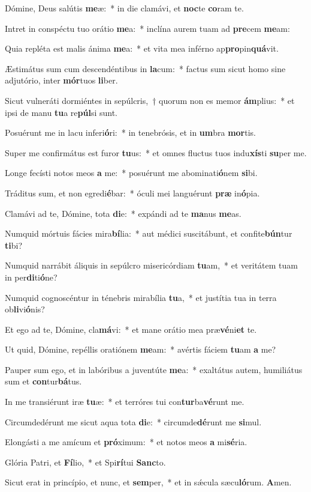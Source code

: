 \item Dómine, Deus salútis \textbf{me}æ:~* in die clamávi, et \textbf{noc}te \textbf{co}ram te.
\item Intret in conspéctu tuo orátio \textbf{me}a:~* inclína aurem tuam ad \textbf{pre}cem \textbf{me}am:
\item Quia repléta est malis ánima \textbf{me}a:~* et vita mea inférno ap\textbf{pro}pin\textbf{quá}vit.
\item Æstimátus sum cum descendéntibus in \textbf{la}cum:~* factus sum sicut homo sine adjutório, inter \textbf{mór}tuos \textbf{li}ber.
\item Sicut vulneráti dormiéntes in sepúlcris,~† quorum non es memor \textbf{ám}plius:~* et ipsi de manu \textbf{tu}a re\textbf{púl}si sunt.
\item Posuérunt me in lacu inferi\textbf{ó}ri:~* in tenebrósis, et in \textbf{um}bra \textbf{mor}tis.
\item Super me confirmátus est furor \textbf{tu}us:~* et omnes fluctus tuos indu\textbf{xís}ti \textbf{su}per me.
\item Longe fecísti notos meos \textbf{a} me:~* posuérunt me abominati\textbf{ó}nem \textbf{si}bi.
\item Tráditus sum, et non egredi\textbf{é}bar:~* óculi mei languérunt \textbf{præ} in\textbf{ó}pia.
\item Clamávi ad te, Dómine, tota \textbf{di}e:~* expándi ad te \textbf{ma}nus \textbf{me}as.
\item Numquid mórtuis fácies mira\textbf{bí}lia:~* aut médici suscitábunt, et confite\textbf{bún}tur \textbf{ti}bi?
\item Numquid narrábit áliquis in sepúlcro misericórdiam \textbf{tu}am,~* et veritátem tuam in per\textbf{di}ti\textbf{ó}ne?
\item Numquid cognoscéntur in ténebris mirabília \textbf{tu}a,~* et justítia tua in terra ob\textbf{li}vi\textbf{ó}nis?
\item Et ego ad te, Dómine, cla\textbf{má}vi:~* et mane orátio mea præ\textbf{vé}ni\textbf{et} te.
\item Ut quid, Dómine, repéllis oratiónem \textbf{me}am:~* avértis fáciem \textbf{tu}am \textbf{a} me?
\item Pauper sum ego, et in labóribus a juventúte \textbf{me}a:~* exaltátus autem, humiliátus sum et \textbf{con}tur\textbf{bá}tus.
\item In me transiérunt iræ \textbf{tu}æ:~* et terróres tui con\textbf{tur}ba\textbf{vé}runt me.
\item Circumdedérunt me sicut aqua tota \textbf{di}e:~* circumde\textbf{dé}runt me \textbf{si}mul.
\item Elongásti a me amícum et \textbf{pró}ximum:~* et notos meos \textbf{a} mi\textbf{sé}ria.
\item Glória Patri, et \textbf{Fí}lio,~* et Spi\textbf{rí}tui \textbf{Sanc}to.
\item Sicut erat in princípio, et nunc, et \textbf{sem}per,~* et in sǽcula sæcu\textbf{ló}rum. \textbf{A}men.
